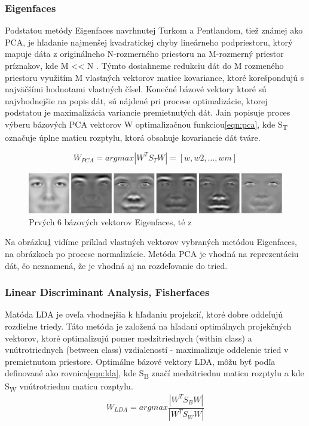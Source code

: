 \subsubsection{Eigenfaces}
Podstatou metódy Eigenfaces navrhnutej Turkom a Pentlandom\cite{turk1991eigenfaces}, tiež známej ako PCA,
je hľadanie najmenšej kvadratickej chyby lineárneho podpriestoru,
ktorý mapuje dáta z originálneho N-rozmerného priestoru na M-rozmerný priestor príznakov, kde M << N .
Týmto dosiahneme redukciu dát do M rozmeného priestoru využitím M vlastných vektorov matice kovariance, ktoré korešpondujú s najväčšími hodnotami vlastných čísel\cite{handbookbio}.
Konečné bázové vektory ktoré sú najvhodnejšie na popis dát, sú nájdené pri procese optimalizácie, ktorej podstatou je  maximalizácia variancie premietnutých dát.
Jain popisuje\cite{handbookbio} proces výberu bázových PCA vektorov W optimalizačnou funkciou\eqref{eqn:pca}, kde S\textsubscript{T} označuje úplne maticu rozptylu,
ktorá obsahuje kovariancie dát tváre.


\begin{equation}\label{eqn:pca}
	W_{PCA} = arg max|W^T S_T W| = [w, w2,\dots,wm]
\end{equation}

\begin{figure}[H]
	\centering
	\includegraphics[width=1\linewidth]{img/eigenfaces}
	\caption{Prvých 6 bázových vektorov Eigenfaces, té z\cite[p.~45]{handbookbio}}
	\label{fig:eigenfaces}
\end{figure}

Na obrázku\ref{fig:eigenfaces} vidíme príklad vlastných vektorov vybraných metódou Eigenfaces, na obrázkoch po procese normalizácie.
Metóda PCA je vhodná na reprezentáciu dát, čo neznamená, že je vhodná aj na rozdeľovanie do tried.

\subsubsection{Linear Discriminant Analysis, Fisherfaces}
Matóda LDA\cite{duda2012pattern} je oveľa vhodnejšia k hľadaniu projekcií, ktoré dobre oddeľujú rozdielne triedy.
Táto metóda je založená na hľadaní optimálnych projekčných vektorov, ktoré optimalizujú pomer medzitriednych (within class) a vnútrotriednych (between class) vzdialeností - maximalizuje oddelenie tried
v premietnutom priestore.
Optimálne bázové vektory LDA, môžu byť podľa\cite{handbookbio} definované ako rovnica\eqref{eqn:lda}, kde S\textsubscript{B} značí medzitriednu maticu rozptylu a kde S\textsubscript{W}
vnútrotriednu maticu rozptylu.\\
\indent
\begin{equation}\label{eqn:lda}
	W_{LDA} = arg max \frac{|W^T S_B W|}{|W^T S_W W|}
\end{equation}

